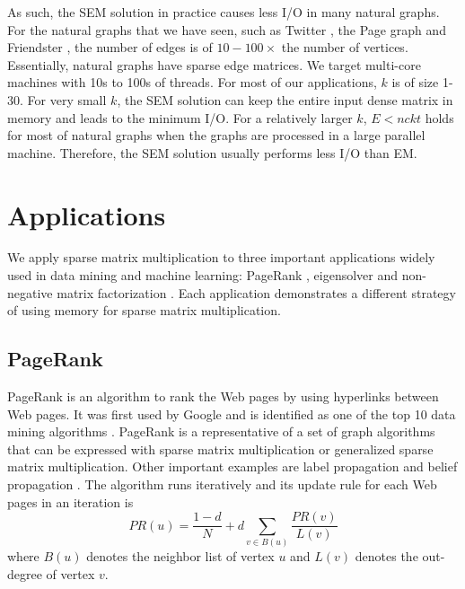 As such, the SEM solution in practice causes less I/O in many natural graphs.
For the natural graphs that we have seen, such as Twitter \cite{twitter},
the Page graph \cite{web_graph} and Friendster \cite{friendster}, the number
of edges is of $10-100 \times$ the number of vertices. Essentially,
natural graphs have sparse edge matrices. We target multi-core machines with
10s to 100s of threads. For most of our applications, $k$ is of size 1-30.
For very small $k$, the SEM solution can keep the entire input dense matrix
in memory and leads to the minimum I/O. For a relatively larger $k$, $E < n c k t$
holds for most of natural graphs when the graphs are processed in a large
parallel machine. Therefore, the SEM solution usually performs less I/O than EM.

\section{Applications} \label{sec:apps}
We apply sparse matrix multiplication to three important applications widely
used in data mining and machine learning: PageRank \cite{pagerank},
eigensolver \cite{anasazi} and non-negative matrix factorization \cite{nmf}.
Each application demonstrates a different strategy of using memory for sparse
matrix multiplication.

\subsection{PageRank} \label{sec:pagerank}
PageRank is an algorithm to rank the Web pages by using hyperlinks between Web
pages. It was first used by Google and is identified as one of the top 10 data
mining algorithms \cite{top10}. PageRank is a representative of a set of graph
algorithms that can be expressed with sparse matrix multiplication or generalized
sparse matrix multiplication. Other important examples are label propagation
\cite{label_prop} and belief propagation \cite{Yedidia03}. The algorithm runs
iteratively and its update rule for each Web pages in an iteration is
\begin{equation*}
PR(u) = \frac{1-d}{N} + d \sum\limits_{v \in B(u)} \frac{PR(v)}{L(v)}
\end{equation*}
where $B(u)$ denotes the neighbor list of vertex $u$ and $L(v)$ denotes
the out-degree of vertex $v$. %



